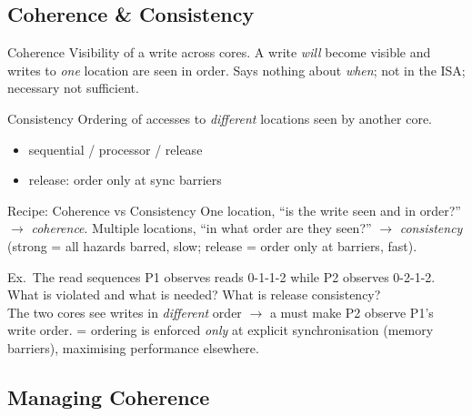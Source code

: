 \multend

\subsection{Coherence \& Consistency}


\begin{definition}{Coherence}
    Visibility of a write across cores. A write \emph{will} become visible and writes to \emph{one} location are seen in order. Says nothing about \emph{when}; not in the ISA; necessary not sufficient.
\end{definition}

\begin{definition}{Consistency}
    Ordering of accesses to \emph{different} locations seen by another core.
    \begin{itemize}
        \item sequential / processor / release
        \item release: order only at sync barriers
    \end{itemize}
\end{definition}

\multend

\begin{KR}{Recipe: Coherence vs Consistency}
    One location, ``is the write seen and in order?'' $\to$ \emph{coherence}. Multiple locations, ``in what order are they seen?'' $\to$ \emph{consistency} (strong = all hazards barred, slow; release = order only at barriers, fast).
\end{KR}

\begin{example2}{Ex.\ The read sequences}
    P1 observes reads 0-1-1-2 while P2 observes 0-2-1-2. What is violated and what is needed? What is release consistency?
     \\ 
    The two cores see writes in \emph{different} order $\to$ a  must make P2 observe P1's write order.  = ordering is enforced \emph{only} at explicit synchronisation (memory barriers), maximising performance elsewhere.
\end{example2}

\subsection{Managing Coherence}


